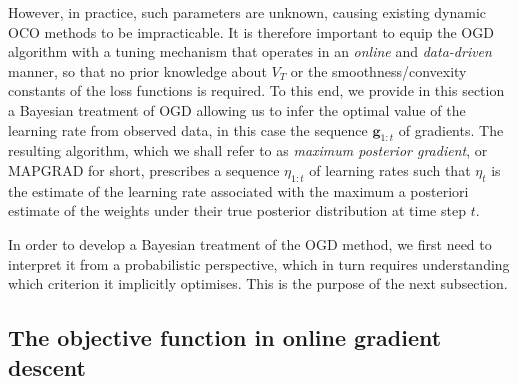 \begin{mccorrection}
However, in practice, such parameters are unknown, causing existing dynamic OCO methods to be impracticable. It is therefore important to equip the OGD algorithm with a tuning mechanism that operates in an \emph{online} and \emph{data-driven} manner, so that no prior knowledge about $V_T$ or the smoothness/convexity constants of the loss functions is required. To this end, we provide in this section a Bayesian treatment of OGD allowing us to infer the optimal value of the learning rate from observed data, in this case the sequence $\mathbf{g}_{1:t}$ of gradients. The resulting algorithm, which we shall refer to as \emph{maximum posterior gradient}, or MAPGRAD for short, prescribes a sequence $\eta_{1:t}$ of learning rates such that $\eta_t$ is the estimate of the learning rate associated with the maximum a posteriori estimate of the weights under their true posterior distribution at time step $t$.
\end{mccorrection}

In order to develop a Bayesian treatment of the OGD method, we first need to interpret it from a probabilistic perspective, which in turn requires understanding which criterion it implicitly optimises. This is the purpose of the next subsection.

\subsection{The objective function in online gradient descent}
\label{sec:ogd-criterion}

